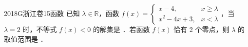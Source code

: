 
\begin{problem}{2018}{G}{浙江卷}{15}{函数}
已知 $ \lambda\in\mathbb{R} $，函数 $ f(x)=
\begin{cases}
x-4, & x\geqslant\lambda\\
x^2-4x+3, & x<\lambda
\end{cases}
$，当 $ \lambda=2 $ 时，不等式 $ f(x)<0 $ 的解集是 \underline{\hspace{4em}}．若函数 $ f(x) $ 恰有 2 个零点，则 $ \lambda $ 的取值范围是 \underline{\hspace{4em}}．
\end{problem}

\begin{answer}

\end{answer}

\begin{solutions}

\end{solutions}